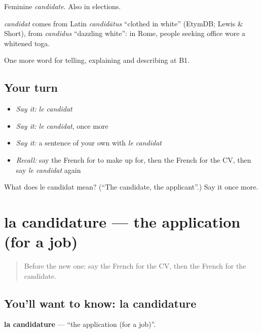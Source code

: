 Feminine \emph{candidate}. Also in elections.

\begin{cousinweb}
\emph{candidat} comes from Latin \emph{candidātus} \textquotedblleft{}clothed in white\textquotedblright{} (EtymDB; Lewis \& Short), from \emph{candidus} \textquotedblleft{}dazzling white\textquotedblright{}: in Rome, people seeking office wore a whitened toga.
\end{cousinweb}

\begin{grammarlens}[title={What you've built}]
One more word for telling, explaining and describing at B1.
\end{grammarlens}

\subsection*{Your turn}
\begin{itemize}
\raggedright
  \item \emph{Say it:} \emph{le candidat}
  \item \emph{Say it:} \emph{le candidat}, once more
  \item \emph{Say it:} a sentence of your own with \emph{le candidat}
  \item \emph{Recall:} say the French for to make up for, then the French for the CV, then say \emph{le candidat} again
\end{itemize}

\begin{tcolorbox}[breakable,colback=teal!4,colframe=teal!35!black,title={Before you move on}]
What does le candidat mean? (\textquotedblleft{}The candidate, the applicant\textquotedblright{}.) Say it once more.
\end{tcolorbox}
\section[la candidature]{la candidature — the application (for a job)}

\label{lesson:FR-C354-candidature}



\begin{quote}
Before the new one: say the French for the CV, then the French for the candidate.
\end{quote}

\subsection*{You'll want to know: la candidature}
\textbf{la candidature} — \textquotedblleft{}the application (for a job)\textquotedblright{}.

